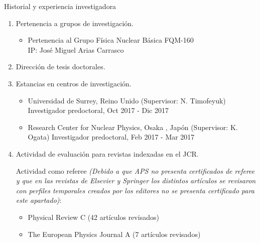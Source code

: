 \documentclass{resume2} %
\begin{document}
\begin{rSection}{Historial y experiencia investigadora}
\begin{enumerate}[label=\alph*.]
\item Pertenencia a grupos de investigación.

\begin{itemize}
\item Pertenencia al Grupo F\'isica Nuclear B\'asica FQM-160 \\
IP: Jos\'e Miguel Arias Carrasco
\end{itemize}

\item Direcci\'on de tesis doctorales.

\item Estancias en centros de investigaci\'on.

\begin{itemize}

\item Universidad de Surrey, Reino Unido (Supervisor: N. Timofeyuk) \newline Investigador predoctoral, Oct 2017 - Dic 2017 
\newline\quad{}

\item  Research Center for Nuclear Physics, Osaka , Jap\'on (Supervisor: K. Ogata) \newline Investigador predoctoral, Feb 2017 - Mar 2017 
\newline\quad{}
\end{itemize}

\item  Actividad de evaluación para revistas indexadas en el JCR.

Actividad como referee \textit{(Debido a que APS no presenta certificados de referee y que en las revistas de Elsevier y Springer los distintos artículos se revisaron con perfiles temporales creados por los editores no se presenta certificado para este apartado)}:

\begin{itemize}
\item Physical Review C (42 art\'iculos revisados)

\item The European Physics Journal A (7 art\'iculos revisados)


\end{itemize}
\end{enumerate}
\end{rSection}
\end{document}
